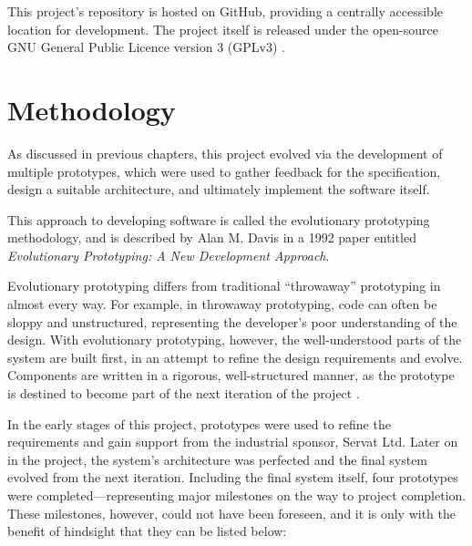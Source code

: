 This project's repository is hosted on GitHub, providing a centrally accessible
location for development. The project itself is released under the open-source
GNU General Public Licence version 3 (GPLv3) \cite{stallman1991}.

\section{Methodology}
\label{sec:implementation-methodology}

As discussed in previous chapters, this project evolved via the development of
multiple prototypes, which were used to gather feedback for the specification,
design a suitable architecture, and ultimately implement the software itself.

This approach to developing software is called the evolutionary prototyping
methodology, and is described by Alan M. Davis in a 1992 paper entitled
\emph{Evolutionary Prototyping: A New Development Approach}.

Evolutionary prototyping differs from traditional ``throwaway'' prototyping in
almost every way. For example, in throwaway prototyping, code can often be
sloppy and unstructured, representing the developer's poor understanding of the
design. With evolutionary prototyping, however, the well-understood parts of
the system are built first, in an attempt to refine the design requirements and
evolve. Components are written in a rigorous, well-structured manner, as the
prototype is destined to become part of the next iteration of the project
\cite{davis1992}.

In the early stages of this project, prototypes were used to refine the
requirements and gain support from the industrial sponsor, Servat Ltd. Later on
in the project, the system's architecture was perfected and the final system
evolved from the next iteration. Including the final system itself, four
prototypes were completed---representing major milestones on the way to project
completion. These milestones, however, could not have been foreseen, and it is
only with the benefit of hindsight that they can be listed below:

